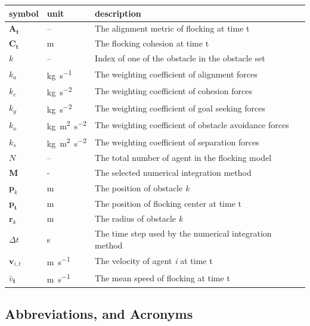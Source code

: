 \documentclass[12pt, titlepage]{article}
\begin{document}
\renewcommand{\arraystretch}{1.2}
\noindent \begin{longtable}{l l p{12cm}} \toprule
\textbf{symbol} & \textbf{unit} & \textbf{description}\\
\midrule 
$\mathbf{A}_\mathbf{t}$ & -- & The alignment metric of flocking at time t \\
$\mathbf{C}_\mathbf{t}$ & \si{\metre} & The flocking cohesion at time t\\
$k$  & -- & Index of one of the obstacle in the obstacle set \\
$k_a$  & \si{\kilogram\per\second} & The weighting coefficient of alignment forces \\
$k_c$  & \si{\kilogram\per\second\squared} & The weighting coefficient of cohesion forces \\
$k_g$  & \si{\kilogram\per\second\squared} & The weighting coefficient of goal seeking forces \\
$k_o$  & \si{\kilogram\metre\squared\per\second\squared} & The weighting coefficient of obstacle avoidance forces \\
$k_s$  & \si{\kilogram\metre\squared\per\second\squared} & The weighting coefficient of separation forces \\
$N$ & -- & The total number of agent in the flocking model \\
$\mathbf{M}$ & - & The selected numerical integration method \\
$\mathbf{p}_{k}$ & \si{\metre} & The position of obstacle \textit{k} \\
$\mathbf{p}_\mathbf{t}$ & \si{\metre} & The position of flocking center at time t \\
$\mathbf{r}_{k}$ & \si{\metre} & The radius of obstacle \textit{k} \\
$\Delta t$ & \si{\second} & The time step used by the numerical integration method \\
$\mathbf{v}_{i,t}$ & \si{\metre\per\second} & The velocity of agent \textit{i} at time t\\
$\bar{v}_\mathbf{t}$ & \si{\metre\per\second} & The mean speed of flocking at time t\\
\bottomrule
\end{longtable}

\subsection{Abbreviations, and Acronyms}
\end{document}
